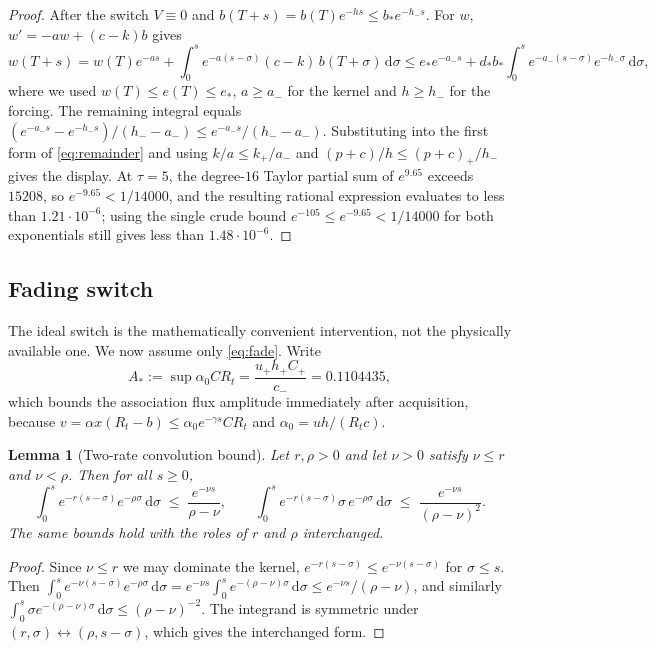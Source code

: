 \documentclass[11pt]{article}
\newtheorem{lemma}[theorem]{Lemma}
\theoremstyle{definition}
\theoremstyle{remark}
\newcommand{\dd}{\,\mathrm{d}}
\begin{document}
\begin{proof}
After the switch $V\equiv0$ and $b(T+s)=b(T)e^{-hs}\le b_*e^{-h_-s}$. For $w$,
$w'=-aw+(c-k)b$ gives
\[
w(T+s)=w(T)e^{-as}+\int_0^s e^{-a(s-\sigma)}(c-k)\,b(T+\sigma)\dd\sigma
\le e_*e^{-a_-s}+d_*b_*\int_0^se^{-a_-(s-\sigma)}e^{-h_-\sigma}\dd\sigma,
\]
where we used $w(T)\le e(T)\le e_*$, $a\ge a_-$ for the kernel and $h\ge h_-$
for the forcing. The remaining integral equals
$(e^{-a_-s}-e^{-h_-s})/(h_--a_-)\le e^{-a_-s}/(h_--a_-)$. Substituting into
the first form of \eqref{eq:remainder} and using $k/a\le k_+/a_-$ and
$(p+c)/h\le(p+c)_+/h_-$ gives the display. At $\tau=5$, the degree-$16$ Taylor
partial sum of $e^{9.65}$ exceeds $15208$, so $e^{-9.65}<1/14000$, and the
resulting rational expression evaluates to less than $1.21\cdot10^{-6}$; using
the single crude bound $e^{-105}\le e^{-9.65}<1/14000$ for both exponentials
still gives less than $1.48\cdot10^{-6}$.
\end{proof}

\subsection{Fading switch}

The ideal switch is the mathematically convenient intervention, not the
physically available one. We now assume only \eqref{eq:fade}. Write
\[
A_*:=\sup\alpha_0CR_t=\frac{u_+h_+C_+}{c_-}=0.1104435,
\]
which bounds the association flux amplitude immediately after acquisition,
because $v=\alpha x(R_t-b)\le\alpha_0e^{-\gamma s}CR_t$ and
$\alpha_0=u h/(R_tc)$.

\begin{lemma}[Two-rate convolution bound]\label{lem:conv}
Let $r,\rho>0$ and let $\nu>0$ satisfy $\nu\le r$ and $\nu<\rho$. Then for all
$s\ge0$,
\[
\int_0^s e^{-r(s-\sigma)}e^{-\rho\sigma}\dd\sigma\;\le\;\frac{e^{-\nu s}}{\rho-\nu},
\qquad
\int_0^s e^{-r(s-\sigma)}\sigma\,e^{-\rho\sigma}\dd\sigma
\;\le\;\frac{e^{-\nu s}}{(\rho-\nu)^2}.
\]
The same bounds hold with the roles of $r$ and $\rho$ interchanged.
\end{lemma}

\begin{proof}
Since $\nu\le r$ we may dominate the kernel, $e^{-r(s-\sigma)}\le
e^{-\nu(s-\sigma)}$ for $\sigma\le s$. Then
$\int_0^se^{-\nu(s-\sigma)}e^{-\rho\sigma}\dd\sigma
=e^{-\nu s}\int_0^se^{-(\rho-\nu)\sigma}\dd\sigma\le e^{-\nu s}/(\rho-\nu)$,
and similarly $\int_0^s\sigma e^{-(\rho-\nu)\sigma}\dd\sigma\le(\rho-\nu)^{-2}$.
The integrand is symmetric under $(r,\sigma)\leftrightarrow(\rho,s-\sigma)$,
which gives the interchanged form.
\end{proof}
\end{document}
